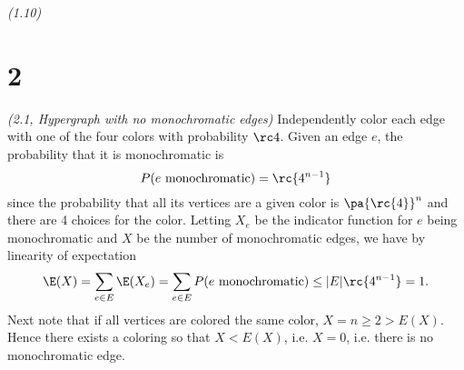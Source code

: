 \begin{problem} {\it (1.10)}
\end{problem}

\section{2}
\begin{problem}{\it (2.1, Hypergraph with no monochromatic edges)}
Independently color each edge with one of the four colors with probability $\rc 4$. Given an edge $e$, the probability that it is monochromatic is 
\[
P(e \text{ monochromatic})=\rc{4^{n-1}}
\]
since the probability that all its vertices are a given color is $\pa{\rc{4}}^n$ and there are 4 choices for the color. Letting $X_e$ be the indicator function for $e$ being monochromatic and $X$ be the number of monochromatic edges, we have by linearity of expectation
\[
\E(X)=\sum_{e\in E} \E(X_e)=\sum_{e\in E}P(e \text{ monochromatic})\leq |E|\rc{4^{n-1}}=1.
\]
Next note that if all vertices are colored the same color, $X=n\geq 2>E(X)$. Hence there exists a coloring so that $X<E(X)$, i.e. $X=0$, i.e. there is no monochromatic edge.
\end{problem}

